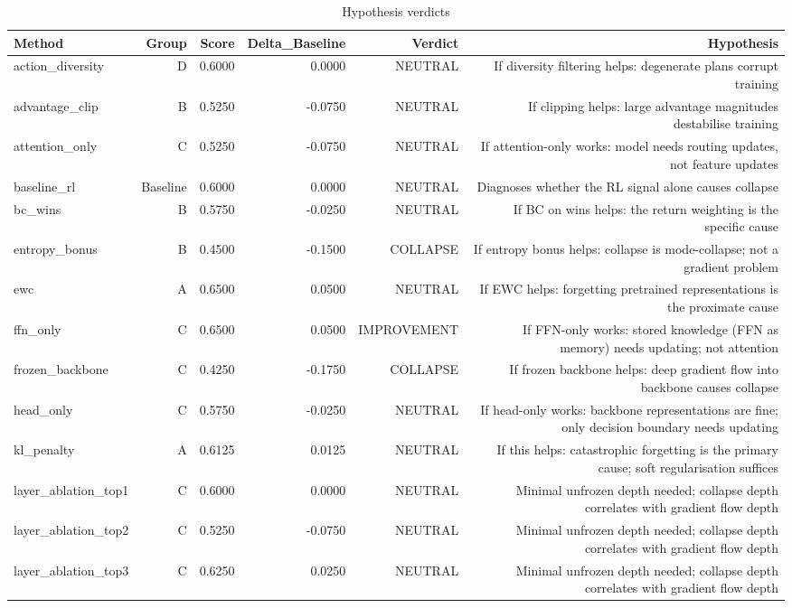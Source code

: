\begin{table}[htbp]
\centering
\caption{Hypothesis verdicts}
\label{tab:hyp-verdicts}
\begin{tabular}{lrrrrr}
\toprule
\textbf{Method} & \textbf{Group} & \textbf{Score} & \textbf{Delta\_Baseline} & \textbf{Verdict} & \textbf{Hypothesis} \\
\midrule
action\_diversity & D & 0.6000 & 0.0000 & NEUTRAL & If diversity filtering helps: degenerate plans corrupt training \\
advantage\_clip & B & 0.5250 & -0.0750 & NEUTRAL & If clipping helps: large advantage magnitudes destabilise training \\
attention\_only & C & 0.5250 & -0.0750 & NEUTRAL & If attention-only works: model needs routing updates, not feature updates \\
baseline\_rl & Baseline & 0.6000 & 0.0000 & NEUTRAL & Diagnoses whether the RL signal alone causes collapse \\
bc\_wins & B & 0.5750 & -0.0250 & NEUTRAL & If BC on wins helps: the return weighting is the specific cause \\
entropy\_bonus & B & 0.4500 & -0.1500 & COLLAPSE & If entropy bonus helps: collapse is mode-collapse; not a gradient problem \\
ewc & A & 0.6500 & 0.0500 & NEUTRAL & If EWC helps: forgetting pretrained representations is the proximate cause \\
ffn\_only & C & 0.6500 & 0.0500 & IMPROVEMENT & If FFN-only works: stored knowledge (FFN as memory) needs updating; not attention \\
frozen\_backbone & C & 0.4250 & -0.1750 & COLLAPSE & If frozen backbone helps: deep gradient flow into backbone causes collapse \\
head\_only & C & 0.5750 & -0.0250 & NEUTRAL & If head-only works: backbone representations are fine; only decision boundary needs updating \\
kl\_penalty & A & 0.6125 & 0.0125 & NEUTRAL & If this helps: catastrophic forgetting is the primary cause; soft regularisation suffices \\
layer\_ablation\_top1 & C & 0.6000 & 0.0000 & NEUTRAL & Minimal unfrozen depth needed; collapse depth correlates with gradient flow depth \\
layer\_ablation\_top2 & C & 0.5250 & -0.0750 & NEUTRAL & Minimal unfrozen depth needed; collapse depth correlates with gradient flow depth \\
layer\_ablation\_top3 & C & 0.6250 & 0.0250 & NEUTRAL & Minimal unfrozen depth needed; collapse depth correlates with gradient flow depth \\

\end{tabular}
\end{table}
